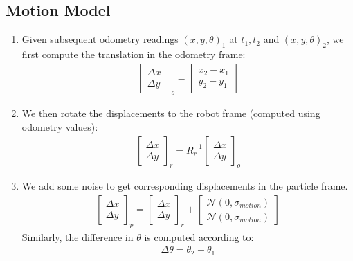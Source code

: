 \documentclass[11pt]{article}
\begin{document}
\subsection{Motion Model}
\begin{enumerate}
\item Given subsequent odometry readings $\left(x,y,\theta\right)_{1}$ at $t_{1}, t_{2}$ and $\left(x,y,\theta\right)_{2}$, we first compute the translation in the odometry frame:
\begin{align*}
\begin{bmatrix}
\Delta x \\
\Delta y
\end{bmatrix}_{o} = 
\begin{bmatrix}
x_{2} - x_{1} \\
y_{2} - y_{1}
\end{bmatrix}
\end{align*} 

\item We then rotate the displacements to the robot frame (computed using odometry values):
\begin{align*}
\begin{bmatrix}
\Delta x \\
\Delta y
\end{bmatrix}_{r} = 
R_{r}^{-1}
\begin{bmatrix}
\Delta x \\
\Delta y
\end{bmatrix}_{o} 
\end{align*}

\item We add some noise to get corresponding displacements in the particle frame.
\begin{align*}
\begin{bmatrix}
\Delta x \\
\Delta y
\end{bmatrix}_{p} = 
\begin{bmatrix}
\Delta x \\
\Delta y
\end{bmatrix}_{r} +
\begin{bmatrix}
\mathcal{N}\left( 0, \sigma_{motion} \right) \\
\mathcal{N}\left( 0, \sigma_{motion} \right)
\end{bmatrix}_{}
\end{align*}
Similarly, the difference in $\theta$ is computed according to:
\begin{align*}
\Delta \theta = \theta_{2} - \theta_{1}
\end{align*}


\end{enumerate}
\end{document}
